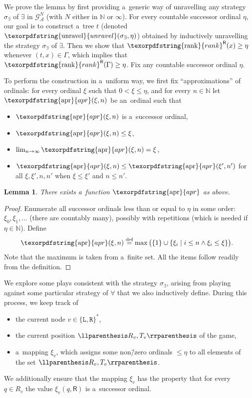 \documentclass[11pt,a4paper]{amsart}
\theoremstyle{plain}
\newtheorem{lem}[thm]{Lemma}
\theoremstyle{definition}
\theoremstyle{defC}
\theoremstyle{thmC}
\theoremstyle{plain}
\numberwithin{equation}{section}
\numberwithin{equation}{section}
\numberwithin{figure}{section}
\newcommand{\ident}[1]{\ensuremath{\texorpdfstring{\mathrm{\mathnm{#1}}}{#1}}\xspace}
\newcommand{\domain}[1]{\ensuremath{\mathbb{#1}}\xspace}
\newcommand{\N}{\domain{N}}
\newcommand{\eqdef}{\stackrel{\text{def}}=}
\newcommand{\mathcalsym}[1]{\ensuremath{\mathcal{#1}}\xspace}
\newcommand{\CA}{\mathcalsym{A}}
\newcommand{\CG}{\mathcalsym{G}}
\newcommand{\dL}{\mathtt{{\scriptstyle L}}}
\newcommand{\dR}{\mathtt{{\scriptstyle R}}}
\newcommand{\mathnm}[1]{#1}
\newcommand{\unravel}{\ident{unravel}}
\newcommand{\sR}{\mathsf{R}}
\newcommand{\rankR}{\ident{rank}^\sR}
\newcommand{\apr}{\ident{apr}}
\newcommand{\eve}{\ensuremath{\exists}\xspace}
\newcommand{\adam}{\ensuremath{\forall}\xspace}
\DeclarePairedDelimiter{\set}{\{}{\}}
\DeclarePairedDelimiter{\pair}{\llparenthesis}{\rrparenthesis}
\begin{document}
\lemSoundness*
\noindent %
We prove the lemma by first providing a~generic way of unravelling any strategy $\sigma_\eve$ of \eve in $\CG^N_\CA$ (with $N$ either in $\N$ or $\infty$).
For every countable successor ordinal $\eta$, our goal is to construct a~tree $t$ (denoted $\unravel(\sigma_\eve, \eta)$) obtained by inductively unravelling the strategy $\sigma_\eve$ of \eve.
Then we show that $\rankR(x)\geq\eta$ whenever $(t,x)\in\Gamma$, which implies that $\rankR(\Gamma)\geq \eta$.
Fix any countable successor ordinal $\eta$.

To perform the construction in a~uniform way, we first fix ``approximations'' of ordinals:
for every ordinal $\xi$ such that $0<\xi\leq\eta$, and for every $n\in\N$ let $\apr(\xi,n)$ be an~ordinal such that
\begin{itemize}
\item	$\apr(\xi,n)$ is a~successor ordinal,
\item	$\apr(\xi,n)\leq\xi$,
\item	$\lim_{n\to\infty}\apr(\xi,n)=\xi$,
\item	$\apr(\xi,n)\leq\apr(\xi',n')$ for all $\xi,\xi',n, n'$ when $\xi\leq\xi'$ and $n\leq n'$.
\end{itemize}

\begin{lem}
	There exists a~function $\apr$ as above.
\end{lem}

\begin{proof}
	Enumerate all successor ordinals less than or equal to $\eta$ in some order: $\xi_0,\xi_1,\dots$ (there are countably many),
	possibly with repetitions (which is needed if $\eta\in\N$).
	Define
	\[\apr(\xi,n)\eqdef\max\big(\set{1}\cup\set{\xi_i\mid i\leq n\land\xi_i\leq\xi}\big).\]
	Note that the maximum is taken from a~finite set.
	All the items follow readily from the definition.
\end{proof}

We explore some plays consistent with the strategy $\sigma_\eve$, arising from playing against some particular strategy of \adam that we also inductively define.
During this process, we keep track of
\begin{itemize}
\item the current node $v\in\{\dL,\dR\}^\ast$,
\item the current position $\pair{R_v, T_v}$ of the game,
\item a~mapping $\xi_v$, which assigns some non\=/zero ordinals $\leq \eta$ to all elements of the set $\pair{R_v,T_v}$.
\end{itemize}
We additionally ensure that the mapping $\xi_v$ has the property that for every $q\in R_v$ the value $\xi_v(q,\sR)$ is a~successor ordinal.
\end{document}
